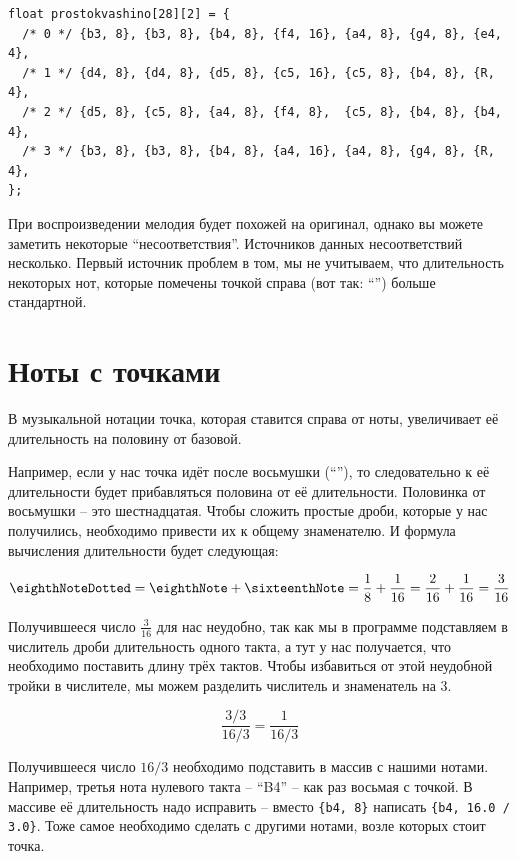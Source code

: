 \documentclass[a4paper,twoside]{book}
\begin{document}
\begin{verbatim}
float prostokvashino[28][2] = {
  /* 0 */ {b3, 8}, {b3, 8}, {b4, 8}, {f4, 16}, {a4, 8}, {g4, 8}, {e4, 4},
  /* 1 */ {d4, 8}, {d4, 8}, {d5, 8}, {c5, 16}, {c5, 8}, {b4, 8}, {R,  4},
  /* 2 */ {d5, 8}, {c5, 8}, {a4, 8}, {f4, 8},  {c5, 8}, {b4, 8}, {b4, 4},
  /* 3 */ {b3, 8}, {b3, 8}, {b4, 8}, {a4, 16}, {a4, 8}, {g4, 8}, {R,  4},
};
\end{verbatim}

При воспроизведении мелодия будет похожей на оригинал, однако вы можете заметить
некоторые ``несоответствия''. Источников данных несоответствий несколько. Первый
источник проблем в том, мы не учитываем, что длительность некоторых нот, которые
помечены точкой справа (вот так: ``\eighthNoteDotted'') больше стандартной.

\section{Ноты с точками}

В музыкальной нотации точка, которая ставится справа от ноты, увеличивает её
длительность на половину от базовой.

Например, если у нас точка идёт после восьмушки (``\eighthNoteDotted''), то
следовательно к её длительности будет прибавляться половина от её длительности.
Половинка от восьмушки -- это шестнадцатая. Чтобы сложить простые дроби, которые
у нас получились, необходимо привести их к общему знаменателю. И формула
вычисления длительности будет следующая:

\begin{equation}
  \mbox{\eighthNoteDotted} = \mbox{\eighthNote} + \mbox{\sixteenthNote}
  = \frac{1}{8} + \frac{1}{16} = \frac{2}{16} + \frac{1}{16} = \frac{3}{16}
\end{equation}

Получившееся число $\frac{3}{16}$ для нас неудобно, так как мы в программе
подставляем в числитель дроби длительность одного такта, а тут у нас получается,
что необходимо поставить длину трёх тактов. Чтобы избавиться от этой неудобной
тройки в числителе, мы можем разделить числитель и знаменатель на 3.

\begin{equation}
  \frac{3 / 3}{16 / 3} = \frac{1}{16 / 3}
\end{equation}

Получившееся число $16 / 3$ необходимо подставить в массив с нашими нотами.
Например, третья нота нулевого такта -- ``B4'' -- как раз восьмая с точкой. В
массиве её длительность надо исправить -- вместо \texttt{\{b4, 8\}} написать
\texttt{\{b4, 16.0 / 3.0\}}. Тоже самое необходимо сделать с другими нотами,
возле которых стоит точка.
\end{document}
